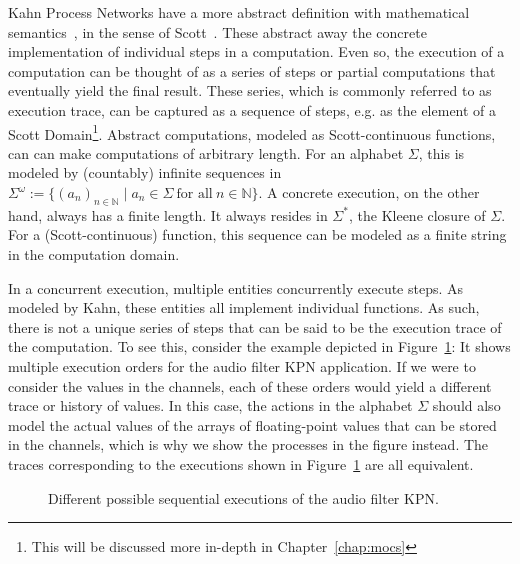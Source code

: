 Kahn Process Networks have a more abstract definition with mathematical semantics~\cite{kahn74}, in the sense of Scott~\cite{scott1970}.
These abstract away the concrete implementation of individual steps in a computation.
Even so, the execution of a computation can be thought of as a series of steps or partial computations that eventually yield the final result.
These series, which is commonly referred to as execution trace, can be captured as a sequence of steps, e.g. as the element of a Scott Domain\footnote{This will be discussed more in-depth in Chapter~\ref{chap:mocs}}. 
Abstract computations, modeled as Scott-continuous functions, can can make computations of arbitrary length.
For an alphabet $\Sigma$, this is modeled by (countably) infinite sequences in $\Sigma^\omega := \{ (a_n)_{n \in \mathbb{N}} \mid a_n \in \Sigma~\text{for all}~n \in \mathbb{N} \}$.
A concrete execution, on the other hand, always has a finite length.
It always resides in $\Sigma^*$, the Kleene closure of $\Sigma$.
For a (Scott-continuous) function, this sequence can be modeled as a finite string in the computation domain.

In a concurrent execution, multiple entities concurrently execute steps.
As modeled by Kahn, these entities all implement individual functions.
As such, there is not a unique series of steps that can be said to be the execution trace of the computation.
To see this, consider the example depicted in Figure~\ref{fig:audio_filter_traces}:
It shows multiple execution orders for the audio filter \ac{KPN} application.
If we were to consider the values in the channels, each of these orders would yield a different trace or history of values.
In this case, the actions in the alphabet $\Sigma$ should also model the actual values of the arrays of floating-point values that can be stored in the channels, which is why we show the processes in the figure instead.
The traces corresponding to the executions shown in Figure~\ref{fig:audio_filter_traces} are all equivalent.

\begin{figure}[h]
	\centering
   \resizebox{0.7\textwidth}{!}{}
   \caption{Different possible sequential executions of the audio filter \ac{KPN}.}
	\label{fig:audio_filter_traces}
\end{figure}



